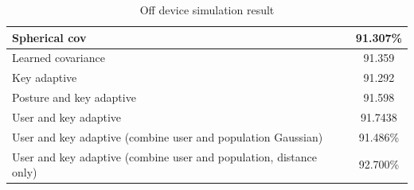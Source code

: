 \documentclass{sigchi}
\begin{document}
\begin{table}[tb]
  \centering
  \begin{tabularx}{\columnwidth}{|X|c|}
  \hline
  Spherical cov & 91.307\% \\
  \hline
  Learned covariance & 91.359 \\
  \hline
  Key adaptive  & 91.292 \\
  \hline
  Posture and key adaptive  & 91.598 \\
  \hline
  User and key adaptive & 91.7438 \\
  \hline
  User and key adaptive (combine user and population Gaussian)  & 91.486\% \\
  \hline
  User and key adaptive (combine user and population, distance only) &  92.700\%
  \\
  \hline
  \end{tabularx}
  \caption{Off device simulation result}
  \label{tab:off-device}
\end{table}
\end{document}
